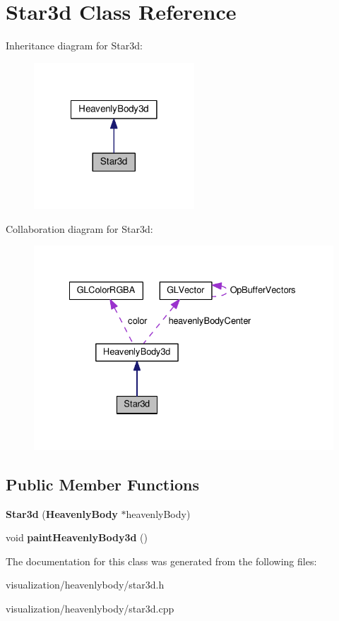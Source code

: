\section{\-Star3d \-Class \-Reference}
\label{d2/d14/classStar3d}


\-Inheritance diagram for \-Star3d\-:\nopagebreak
\begin{figure}[H]
\begin{center}
\leavevmode
\includegraphics[width=170pt]{d0/dd1/classStar3d__inherit__graph}
\end{center}
\end{figure}


\-Collaboration diagram for \-Star3d\-:\nopagebreak
\begin{figure}[H]
\begin{center}
\leavevmode
\includegraphics[width=331pt]{da/dcf/classStar3d__coll__graph}
\end{center}
\end{figure}
\subsection*{\-Public \-Member \-Functions}
\begin{DoxyCompactItemize}
\item 
{\bfseries \-Star3d} ({\bf \-Heavenly\-Body} $\ast$heavenly\-Body)\label{d2/d14/classStar3d_a2d09eb43e716f50254f12a6f0d5cd8f4}

\item 
void {\bfseries paint\-Heavenly\-Body3d} ()\label{d2/d14/classStar3d_a131a6612a83da74b25db2ff389e91424}

\end{DoxyCompactItemize}


\-The documentation for this class was generated from the following files\-:\begin{DoxyCompactItemize}
\item 
visualization/heavenlybody/star3d.\-h\item 
visualization/heavenlybody/star3d.\-cpp\end{DoxyCompactItemize}
